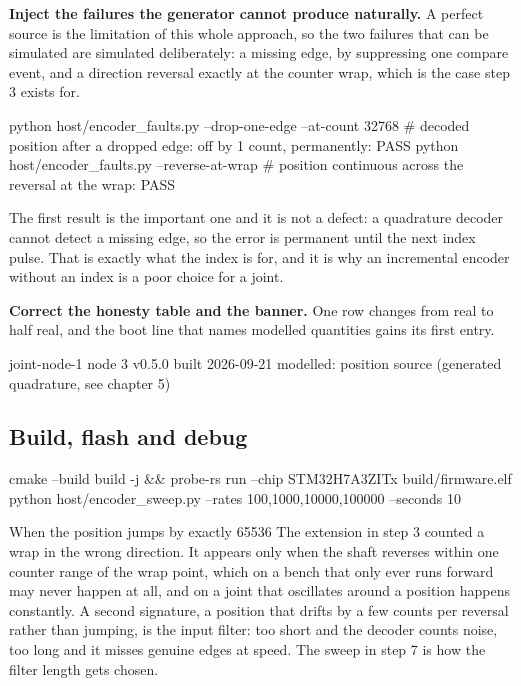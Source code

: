 \begin{steps}
\item \textbf{Inject the failures the generator cannot produce naturally.} A
perfect source is the limitation of this whole approach, so the two failures
that can be simulated are simulated deliberately: a missing edge, by suppressing
one compare event, and a direction reversal exactly at the counter wrap, which
is the case step 3 exists for.
\begin{shellcode}
python host/encoder_faults.py --drop-one-edge --at-count 32768
# decoded position after a dropped edge: off by 1 count, permanently: PASS
python host/encoder_faults.py --reverse-at-wrap
# position continuous across the reversal at the wrap: PASS
\end{shellcode}
The first result is the important one and it is not a defect: a quadrature
decoder cannot detect a missing edge, so the error is permanent until the next
index pulse. That is exactly what the index is for, and it is why an incremental
encoder without an index is a poor choice for a joint.

\item \textbf{Correct the honesty table and the banner.} One row changes from
real to half real, and the boot line that names modelled quantities gains its
first entry.
\begin{shellcode}
joint-node-1  node 3  v0.5.0  built 2026-09-21
modelled: position source (generated quadrature, see chapter 5)
\end{shellcode}
\end{steps}

\subsection*{Build, flash and debug}


\begin{shellcode}
cmake --build build -j && probe-rs run --chip STM32H7A3ZITx build/firmware.elf
python host/encoder_sweep.py --rates 100,1000,10000,100000 --seconds 10
\end{shellcode}

\begin{note}{When the position jumps by exactly 65536}
The extension in step 3 counted a wrap in the wrong direction. It appears only
when the shaft reverses within one counter range of the wrap point, which on a
bench that only ever runs forward may never happen at all, and on a joint that
oscillates around a position happens constantly. A second signature, a position
that drifts by a few counts per reversal rather than jumping, is the input
filter: too short and the decoder counts noise, too long and it misses genuine
edges at speed. The sweep in step 7 is how the filter length gets chosen.
\end{note}

